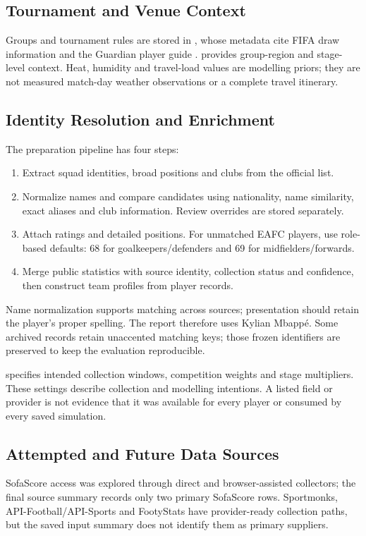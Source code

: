 \subsection{Tournament and Venue Context}
Groups and tournament rules are stored in
, whose metadata cite FIFA draw
information and the Guardian player guide \cite{data-draw,data-guardian}.
 provides group-region and stage-level
context. Heat, humidity and travel-load values are modelling priors; they are
not measured match-day weather observations or a complete travel itinerary.
\subsection{Identity Resolution and Enrichment}
The preparation pipeline has four steps:
\begin{enumerate}
\item Extract squad identities, broad positions and clubs from the official list.
\item Normalize names and compare candidates using nationality, name similarity,
exact aliases and club information. Review overrides are stored separately.
\item Attach ratings and detailed positions. For unmatched EAFC players, use
role-based defaults: 68 for goalkeepers/defenders and 69 for midfielders/forwards.
\item Merge public statistics with source identity, collection status and confidence,
then construct team profiles from player records.
\end{enumerate}
Name normalization supports matching across sources; presentation should retain
the player's proper spelling. The report therefore uses Kylian Mbapp\'{e}.
Some archived records retain unaccented matching keys; those frozen identifiers
are preserved to keep the evaluation reproducible.

 specifies intended collection windows,
competition weights and stage multipliers. These settings describe collection
and modelling intentions. A listed field or provider is not evidence that it
was available for every player or consumed by every saved simulation.
\subsection{Attempted and Future Data Sources}
SofaScore access was explored through direct and browser-assisted collectors;
the final source summary records only two primary SofaScore rows. Sportmonks,
API-Football/API-Sports and FootyStats have provider-ready collection paths,
but the saved input summary does not identify them as primary suppliers.


